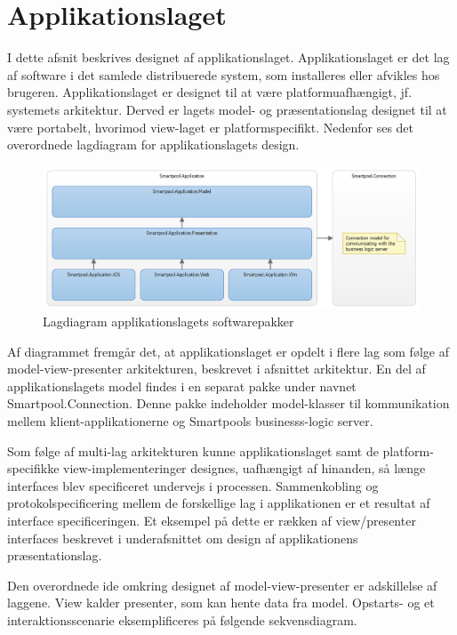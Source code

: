 \section{Applikationslaget}
I dette afsnit beskrives designet af applikationslaget. Applikationslaget er det lag af software i det samlede distribuerede system, som installeres eller afvikles hos brugeren. Applikationslaget er designet til at være platformuafhængigt, jf. systemets arkitektur. Derved er lagets model- og præsentationslag designet til at være portabelt, hvorimod view-laget er platformspecifikt. Nedenfor ses det overordnede lagdiagram for applikationslagets design.

\begin{figure}
	\centering
	\includegraphics[width=1.0\linewidth]{figs/design/application_layer}
	\caption{Lagdiagram applikationslagets softwarepakker}
	\label{fig:application_layer}
\end{figure}

Af diagrammet fremgår det, at applikationslaget er opdelt i flere lag som følge af model-view-presenter arkitekturen, beskrevet i afsnittet arkitektur. En del af applikationslagets model findes i en separat pakke under navnet Smartpool.Connection. Denne pakke indeholder model-klasser til kommunikation mellem klient-applikationerne og Smartpools businesss-logic server.

Som følge af multi-lag arkitekturen kunne applikationslaget samt de platform-specifikke view-implementeringer designes, uafhængigt af hinanden, så længe interfaces blev specificeret undervejs i processen. Sammenkobling og protokolspecificering mellem de forskellige lag i applikationen er et resultat af interface specificeringen. Et eksempel på dette er rækken af view/presenter interfaces beskrevet i underafsnittet om design af applikationens præsentationslag.

Den overordnede ide omkring designet af model-view-presenter er adskillelse af laggene. View kalder presenter, som kan hente data fra model. Opstarts- og et interaktionsscenarie eksemplificeres på følgende sekvensdiagram.

